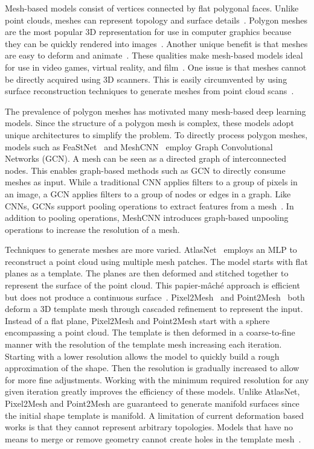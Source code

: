 Mesh-based models consist of vertices connected by flat polygonal faces. Unlike point clouds, meshes can represent topology and surface details~\cite{Xiao2020}. Polygon meshes are the most popular 3D representation for use in computer graphics because they can be quickly rendered into images~\cite{Watt1996}. Another unique benefit is that meshes are easy to deform and animate~\cite{Wang2018}. These qualities make mesh-based models ideal for use in video games, virtual reality, and film~\cite{Nash2020}. One issue is that meshes cannot be directly acquired using 3D scanners. This is easily circumvented by using surface reconstruction techniques to generate meshes from point cloud scans~\cite{Yuan2022}.

The prevalence of polygon meshes has motivated many mesh-based deep learning models. Since the structure of a polygon mesh is complex, these models adopt unique architectures to simplify the problem. To directly process polygon meshes, models such as FeaStNet~\cite{Verma2018} and MeshCNN~\cite{Hanocka2019} employ Graph Convolutional Networks (GCN). A mesh can be seen as a directed graph of interconnected nodes. This enables graph-based methods such as GCN to directly consume meshes as input. While a traditional CNN applies filters to a group of pixels in an image, a GCN applies filters to a group of nodes or edges in a graph. Like CNNs, GCNs support pooling operations to extract features from a mesh~\cite{Verma2018}. In addition to pooling operations, MeshCNN introduces graph-based unpooling operations to increase the resolution of a mesh.

Techniques to generate meshes are more varied. AtlasNet~\cite{Groueix2018} employs an MLP to reconstruct a point cloud using multiple mesh patches. The model starts with flat planes as a template. The planes are then deformed and stitched together to represent the surface of the point cloud. This papier-m\^{a}ch\'{e} approach is efficient but does not produce a continuous surface~\cite{Groueix2018}. Pixel2Mesh~\cite{Wang2018} and Point2Mesh~\cite{Hanocka2020} both deform a 3D template mesh through cascaded refinement to represent the input. Instead of a flat plane, Pixel2Mesh and Point2Mesh start with a sphere encompassing a point cloud. The template is then deformed in a coarse-to-fine manner with the resolution of the template mesh increasing each iteration. Starting with a lower resolution allows the model to quickly build a rough approximation of the shape. Then the resolution is gradually increased to allow for more fine adjustments. Working with the minimum required resolution for any given iteration greatly improves the efficiency of these models. Unlike AtlasNet, Pixel2Mesh and Point2Mesh are guaranteed to generate manifold surfaces since the initial shape template is manifold. A limitation of current deformation based works is that they cannot represent arbitrary topologies. Models that have no means to merge or remove geometry cannot create holes in the template mesh~\cite{Wang2018, Hanocka2020}.

